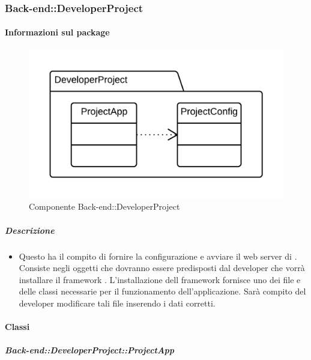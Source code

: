   \subsubsection{Back-end::DeveloperProject}
  \paragraph{Informazioni sul package} 
    \begin{figure}[H] 
      \begin{center} 
        \includegraphics[width=\textwidth]{packages/Back-end::DeveloperProject.png}  
        \caption{Componente Back-end::DeveloperProject}
      \end{center}  
    \end{figure} 
  \subparagraph{Descrizione} 
    \begin{itemize}
    \item[] Questo  ha il compito di fornire la configurazione e avviare il web server di . Consiste negli oggetti che dovranno essere predisposti dal developer che vorrà installare il framework . L'installazione dell framework  fornisce uno  dei file e delle classi necessarie per il funzionamento dell'applicazione. Sarà compito del developer modificare tali file inserendo i dati corretti.
    \end{itemize} 
    \paragraph{Classi}
      \subparagraph{Back-end::DeveloperProject::ProjectApp}
        
